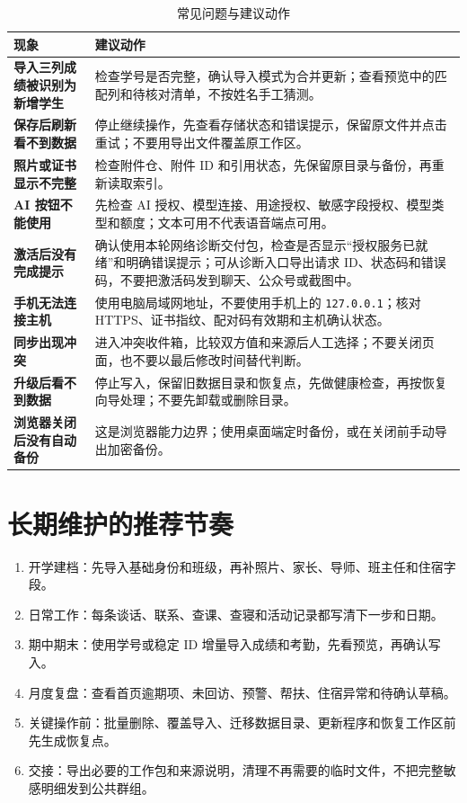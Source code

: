\documentclass[UTF8,zihao=-4,oneside]{ctexrep}
\newcommand{\code}[1]{\texttt{\small #1}}
\begin{document}
\small
\begin{longtable}{>{\bfseries}p{45mm} p{94mm}}
\caption{常见问题与建议动作}\\
\toprule
现象 & 建议动作 \\
\midrule
导入三列成绩被识别为新增学生 & 检查学号是否完整，确认导入模式为合并更新；查看预览中的匹配列和待核对清单，不按姓名手工猜测。 \\
保存后刷新看不到数据 & 停止继续操作，先查看存储状态和错误提示，保留原文件并点击重试；不要用导出文件覆盖原工作区。 \\
照片或证书显示不完整 & 检查附件仓、附件 ID 和引用状态，先保留原目录与备份，再重新读取索引。 \\
AI 按钮不能使用 & 先检查 AI 授权、模型连接、用途授权、敏感字段授权、模型类型和额度；文本可用不代表语音端点可用。 \\
激活后没有完成提示 & 确认使用本轮网络诊断交付包，检查是否显示“授权服务已就绪”和明确错误提示；可从诊断入口导出请求 ID、状态码和错误码，不要把激活码发到聊天、公众号或截图中。 \\
手机无法连接主机 & 使用电脑局域网地址，不要使用手机上的 \code{127.0.0.1}；核对 HTTPS、证书指纹、配对码有效期和主机确认状态。 \\
同步出现冲突 & 进入冲突收件箱，比较双方值和来源后人工选择；不要关闭页面，也不要以最后修改时间替代判断。 \\
升级后看不到数据 & 停止写入，保留旧数据目录和恢复点，先做健康检查，再按恢复向导处理；不要先卸载或删除目录。 \\
浏览器关闭后没有自动备份 & 这是浏览器能力边界；使用桌面端定时备份，或在关闭前手动导出加密备份。 \\
\bottomrule
\end{longtable}
\normalsize

\section{长期维护的推荐节奏}

\begin{enumerate}
  \item 开学建档：先导入基础身份和班级，再补照片、家长、导师、班主任和住宿字段。
  \item 日常工作：每条谈话、联系、查课、查寝和活动记录都写清下一步和日期。
  \item 期中期末：使用学号或稳定 ID 增量导入成绩和考勤，先看预览，再确认写入。
  \item 月度复盘：查看首页逾期项、未回访、预警、帮扶、住宿异常和待确认草稿。
  \item 关键操作前：批量删除、覆盖导入、迁移数据目录、更新程序和恢复工作区前先生成恢复点。
  \item 交接：导出必要的工作包和来源说明，清理不再需要的临时文件，不把完整敏感明细发到公共群组。
\end{enumerate}
\end{document}
